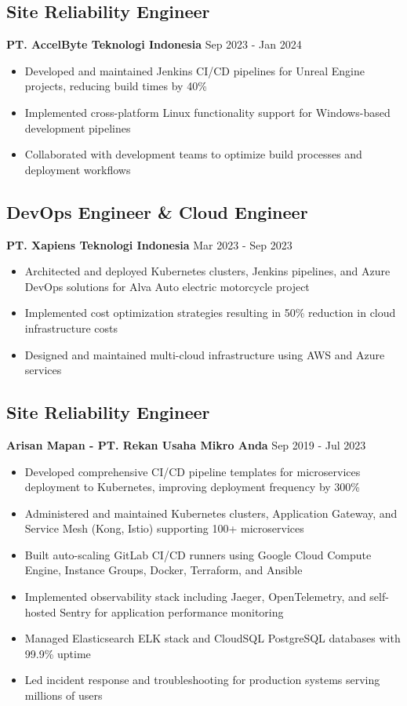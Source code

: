 \documentclass[11pt,a4paper]{article}
\newcommand{\company}[1]{\textbf{\color{primary}#1}}
\newcommand{\daterange}[1]{\color{secondary}#1}  %
\begin{document}
\subsection{Site Reliability Engineer}
\company{PT. AccelByte Teknologi Indonesia} \hfill \daterange{Sep 2023 - Jan 2024}
\begin{itemize}[leftmargin=*, itemsep=2pt]
    \item Developed and maintained Jenkins CI/CD pipelines for Unreal Engine projects, reducing build times by 40\%
    \item Implemented cross-platform Linux functionality support for Windows-based development pipelines
    \item Collaborated with development teams to optimize build processes and deployment workflows
\end{itemize}

\subsection{DevOps Engineer \& Cloud Engineer}
\company{PT. Xapiens Teknologi Indonesia} \hfill \daterange{Mar 2023 - Sep 2023}
\begin{itemize}[leftmargin=*, itemsep=2pt]
    \item Architected and deployed Kubernetes clusters, Jenkins pipelines, and Azure DevOps solutions for Alva Auto electric motorcycle project
    \item Implemented cost optimization strategies resulting in 50\% reduction in cloud infrastructure costs
    \item Designed and maintained multi-cloud infrastructure using AWS and Azure services
\end{itemize}

\subsection{Site Reliability Engineer}
\company{Arisan Mapan - PT. Rekan Usaha Mikro Anda} \hfill \daterange{Sep 2019 - Jul 2023}
\begin{itemize}[leftmargin=*, itemsep=2pt]
    \item Developed comprehensive CI/CD pipeline templates for microservices deployment to Kubernetes, improving deployment frequency by 300\%
    \item Administered and maintained Kubernetes clusters, Application Gateway, and Service Mesh (Kong, Istio) supporting 100+ microservices
    \item Built auto-scaling GitLab CI/CD runners using Google Cloud Compute Engine, Instance Groups, Docker, Terraform, and Ansible
    \item Implemented observability stack including Jaeger, OpenTelemetry, and self-hosted Sentry for application performance monitoring
    \item Managed Elasticsearch ELK stack and CloudSQL PostgreSQL databases with 99.9\% uptime
    \item Led incident response and troubleshooting for production systems serving millions of users
\end{itemize}
\end{document}
